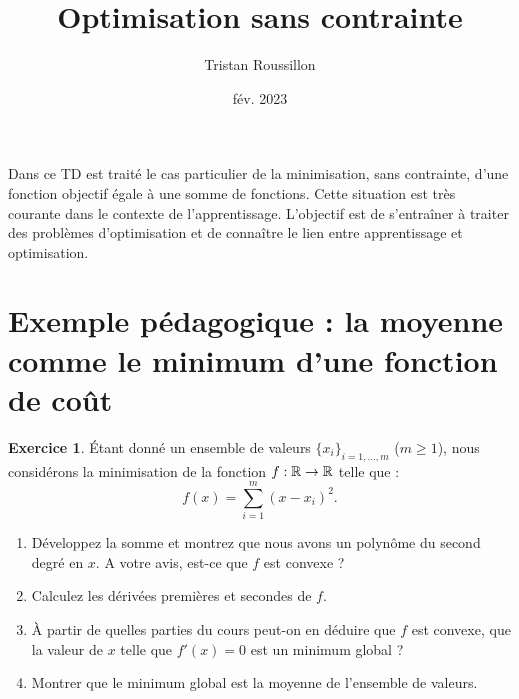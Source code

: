 \documentclass[a4paper,francais]{article}
\title{Optimisation sans contrainte}
\author{Tristan Roussillon}
\date{fév. 2023}
\newcommand{\R}{{\ensuremath\mathbb{R}}}
\theoremstyle{definition}
\newtheorem{exercice}{Exercice}[section]
\begin{document}
\maketitle

Dans ce TD est traité le cas particulier de la minimisation, sans contrainte,
d'une fonction objectif égale à une somme de fonctions. Cette situation est
très courante dans le contexte de l'apprentissage. L'objectif est de s'entraîner
à traiter des problèmes d'optimisation et de connaître le lien entre apprentissage
et optimisation. 

\section{Exemple pédagogique : la moyenne comme le minimum d'une fonction de coût}
\label{sec:moyenne}

\begin{exercice}
  \'Etant donné un ensemble de valeurs $\{x_i\}_{i = 1,\dots,m}$ ($m \geq 1$),
  nous considérons la minimisation de la fonction $f : \R \rightarrow \R$ telle que :
  \[ f(x) = \sum_{i=1}^m (x-x_i)^2. \] 
  
  \begin{enumerate}
  \item Développez la somme et montrez que nous avons un polynôme du second degré en $x$.
    A votre avis, est-ce que $f$ est convexe ?
  \item Calculez les dérivées premières et secondes de $f$.
  \item \`A partir de quelles parties du cours peut-on en déduire que $f$ est convexe,
    que la valeur de $x$ telle que $f'(x) = 0$ est un minimum global ?
  \item Montrer que le minimum global est la moyenne de l'ensemble de valeurs.
  \end{enumerate}
\end{exercice}
\end{document}

